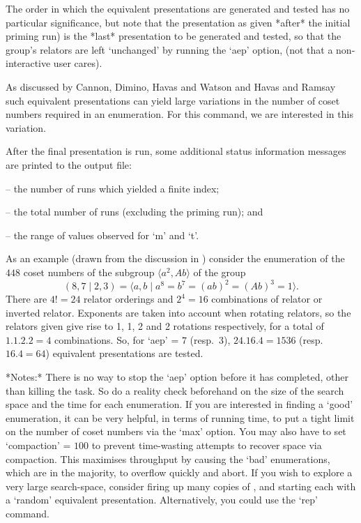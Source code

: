 The order in which the  equivalent  presentations  are  generated  and
tested has no particular significance, but note that the  presentation
as given *after* the initial priming run) is the  *last*  presentation
to be generated and tested, so that  the  group's  relators  are  left
`unchanged' by running the `aep' option, (not that  a  non-interactive
user cares).

As discussed by Cannon, Dimino, Havas  and  Watson  \cite{CDHW73}  and
Havas and Ramsay \cite{HR99b} such equivalent presentations can  yield
large variations in  the  number  of  coset  numbers  required  in  an
enumeration. For this command, we are interested in this variation.

After  the  final  presentation  is  run,   some   additional   status
information messages are printed to the {\ACE} output file:

\beginlist
\item{--}  the number of runs which yielded a finite index; 
\item{--}  the total number of runs (excluding the priming run); and 
\item{--}  the range of values observed for `m' and `t'.
\endlist

As an example (drawn from the discussion in \cite{HR99a}) consider the
enumeration   of   the   $448$   coset   numbers   of   the   subgroup
$\langle  a^2,Ab \rangle$ of the group
$$ (8,7 \mid 2,3) 
    = \langle a,b \mid a^8 = b^7 = (ab)^2 = (Ab)^3 = 1 \rangle. $$
There are $4!=24$  relator  orderings  and  $2^4=16$  combinations  of
relator or inverted relator. Exponents are  taken  into  account  when
rotating relators, so the relators given give rise to 1, 1,  2  and  2
rotations respectively, for a total of $1.1.2.2=4$  combinations.  So,
for  `aep'  =  $7$   (resp.~$3$),   $24.16.4=1536$   (resp.~$16.4=64$)
equivalent presentations are tested.

*Notes:*
There is no way to stop the `aep'  option  before  it  has  completed,
other than killing the task. So do a reality check beforehand  on  the
size of the search space and the time for each enumeration. If you are
interested in  finding  a  \lq{}good'  enumeration,  it  can  be  very
helpful, in terms of running time, to put a tight limit on the  number
of coset numbers via the `max'  option.  You  may  also  have  to  set
`compaction' = $100$ to prevent time-wasting attempts to recover space
via compaction. This maximises throughput  by  causing  the  \lq{}bad'
enumerations, which are in  the  majority,  to  overflow  quickly  and
abort. If you wish to explore  a  very  large  search-space,  consider
firing up many copies of {\ACE}, and starting each with a \lq{}random'
equivalent  presentation.  Alternatively,  you  could  use  the  `rep'
command.

